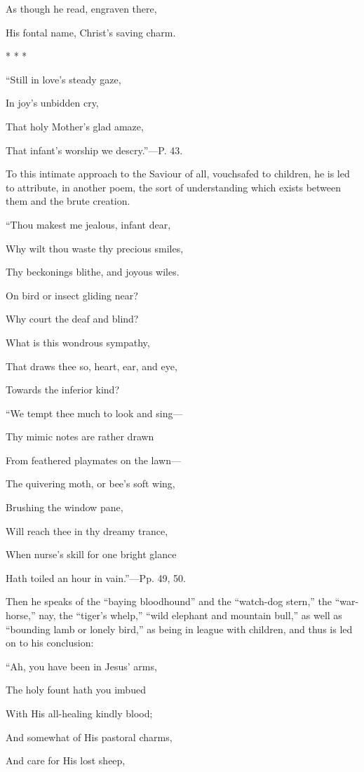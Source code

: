As though he read, engraven there,

His fontal name, Christ's saving charm.

*
*
*

``Still in love's steady gaze,

In
joy's unbidden cry,

That holy Mother's glad amaze,

That infant's worship we descry.''—P.
43.

To this intimate approach to the Saviour of all,
vouchsafed to children, he is led to attribute, in another poem, the
sort of understanding which exists between them and the brute
creation.

``Thou
makest me jealous, infant dear,

Why wilt thou waste thy precious smiles,

Thy beckonings blithe, and joyous wiles.

On bird or insect gliding near?

Why court the deaf and blind?

What is this wondrous sympathy,

That draws thee so, heart, ear, and eye,

Towards the inferior kind?

``We
tempt thee much to look and sing—

Thy mimic notes are rather drawn

From feathered playmates on the lawn—

The quivering moth, or bee's soft wing,

Brushing the window pane,

Will reach thee in thy dreamy trance,

When nurse's skill for one bright glance

Hath toiled an hour in vain.''—Pp. 49, 50.

Then he speaks of the ``baying bloodhound'' and the
``watch-dog stern,'' the ``war-horse,'' nay, the ``tiger's whelp,'' ``wild
elephant and mountain bull,'' as well as ``bounding lamb or lonely bird,''
as being in league with children, and thus is led on to his
conclusion:

``Ah, you
have been in Jesus' arms,

The holy fount hath you imbued

With His all-healing kindly blood;

And somewhat of His pastoral charms,

And care for His lost sheep,

